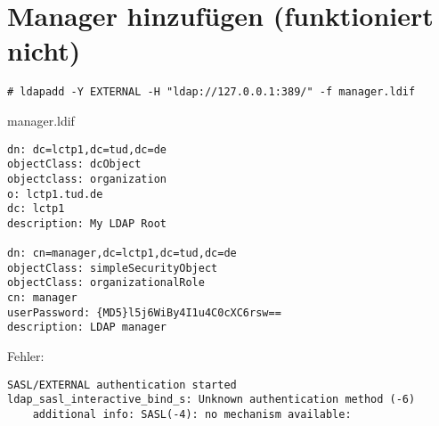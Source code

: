 \section*{Manager hinzufügen (funktioniert nicht)}
\begin{lstlisting}[style=Bash]
# ldapadd -Y EXTERNAL -H "ldap://127.0.0.1:389/" -f manager.ldif
\end{lstlisting}
manager.ldif
\begin{lstlisting}[style=Bash]
dn: dc=lctp1,dc=tud,dc=de
objectClass: dcObject
objectclass: organization
o: lctp1.tud.de
dc: lctp1
description: My LDAP Root

dn: cn=manager,dc=lctp1,dc=tud,dc=de
objectClass: simpleSecurityObject
objectClass: organizationalRole
cn: manager
userPassword: {MD5}l5j6WiBy4I1u4C0cXC6rsw==
description: LDAP manager
\end{lstlisting}
Fehler:
\begin{lstlisting}[style=Bash]
SASL/EXTERNAL authentication started
ldap_sasl_interactive_bind_s: Unknown authentication method (-6)
	additional info: SASL(-4): no mechanism available: 
\end{lstlisting}
